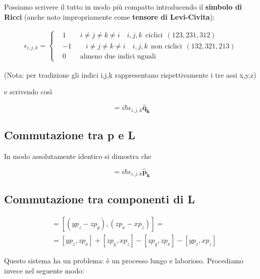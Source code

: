 \newpage
	
Possiamo scrivere il tutto in modo più compatto introducendo il \textbf{simbolo di Ricci} (anche noto impropriamente come \textbf{tensore di Levi-Civita}):

\begin{align}
\epsilon_{i,j,k}=
\left\{\begin{array}{ccc}
{}&1 \qquad i \neq j \neq k \neq i \quad i,j,k \: \: \text{ciclici} \:\: (123,231,312) \quad \: \\
&-1 \qquad i \neq j \neq k \neq i \quad i,j,k \: \: \text{non ciclici} \:\: (132,321,213) \\
&0 \qquad \text{almeno due indici uguali} \qquad \qquad \qquad \qquad \quad
\end{array}\right. 
\end{align}

(Nota: per tradizione gli indici i,j,k rappresentano rispettivamente i tre assi x,y,z)\newline

e scrivendo così

\begin{equation}
[\mathbf{\hat q_i}, \mathbf{\hat L_j}]= i \hbar \epsilon_{i,j,k} \mathbf{\hat q_k}
\end{equation}

\subsection{Commutazione tra p e L}

In modo assolutamente identico si dimostra che

\begin{equation}
[\mathbf{\hat p_i}, \mathbf{\hat L_j}]= i \hbar \epsilon_{i,j,k} \mathbf{\hat p_k}
\end{equation}


\subsection{Commutazione tra componenti di L}

\begin{align}
[\mathbf{\hat L_x}, \mathbf{\hat L_y} ]{}&= [ (y p_z - zp_y) , (zp_x - xp_z) ] = \nonumber \\
&= [y p_z, zp_x] + [z p_y , x p_z] - [zp_y, zp_x] - [yp_z, xp_z]
\end{align}

Questo sistema ha un problema: è un processo lungo e laborioso. Procediamo invece nel seguente modo:

